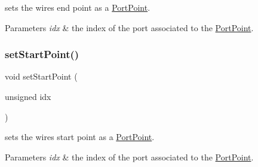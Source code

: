 sets the wire\textquotesingle{}s end point as a \hyperlink{class_open_chams_1_1_port_point}{Port\+Point}. 


\begin{DoxyParams}{Parameters}
{\em idx} & the index of the port associated to the \hyperlink{class_open_chams_1_1_port_point}{Port\+Point}. \\
\hline
\end{DoxyParams}
\mbox{\label{class_open_chams_1_1_wire_a37335a2ff923eb45ff5d4f2f4e41b8b1}} 
\subsubsection{\texorpdfstring{set\+Start\+Point()}{setStartPoint()}}
{\footnotesize\ttfamily void set\+Start\+Point (\begin{DoxyParamCaption}\item[{unsigned}]{idx }\end{DoxyParamCaption})}



sets the wire\textquotesingle{}s start point as a \hyperlink{class_open_chams_1_1_port_point}{Port\+Point}. 


\begin{DoxyParams}{Parameters}
{\em idx} & the index of the port associated to the \hyperlink{class_open_chams_1_1_port_point}{Port\+Point}. \\
\hline
\end{DoxyParams}
